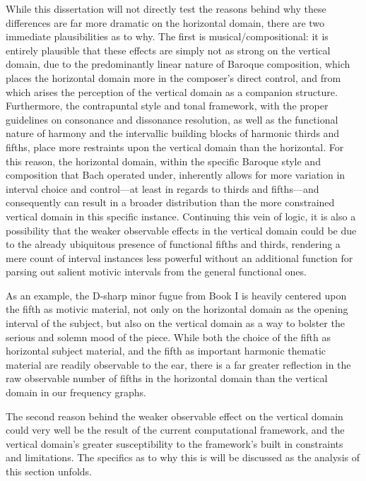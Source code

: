While this dissertation will not directly test the reasons behind why
these differences are far more dramatic on the horizontal domain, there
are two immediate plausibilities as to why. The first is
musical/compositional: it is entirely plausible that these effects are
simply not as strong on the vertical domain, due to the predominantly
linear nature of Baroque composition, which places the horizontal domain
more in the composer's direct control, and from which arises the
perception of the vertical domain as a companion structure. Furthermore,
the contrapuntal style and tonal framework, with the proper guidelines
on consonance and dissonance resolution, as well as the functional
nature of harmony and the intervallic building blocks of harmonic thirds
and fifths, place more restraints upon the vertical domain than the
horizontal. For this reason, the horizontal domain, within the specific
Baroque style and composition that Bach operated under, inherently
allows for more variation in interval choice and control---at least
in regards to thirds and fifths---and consequently can result in a
broader distribution than the more constrained vertical domain in this
specific instance. Continuing this vein of logic, it is also a
possibility that the weaker observable effects in the vertical domain
could be due to the already ubiquitous presence of functional fifths and
thirds, rendering a mere count of interval instances less powerful
without an additional function for parsing out salient motivic intervals
from the general functional ones.

As an example, the D-sharp minor fugue from Book I is heavily centered
upon the fifth as motivic material, not only on the horizontal domain as
the opening interval of the subject, but also on the vertical domain as
a way to bolster the serious and solemn mood of the piece. While both
the choice of the fifth as horizontal subject material, and the fifth as
important harmonic thematic material are readily observable to the ear,
there is a far greater reflection in the raw observable number of fifths
in the horizontal domain than the vertical domain in our frequency
graphs.

The second reason behind the weaker observable effect on the vertical
domain could very well be the result of the current computational
framework, and the vertical domain's greater susceptibility to the
framework's built in constraints and limitations. The specifics as to
why this is will be discussed as the analysis of this section unfolds.

